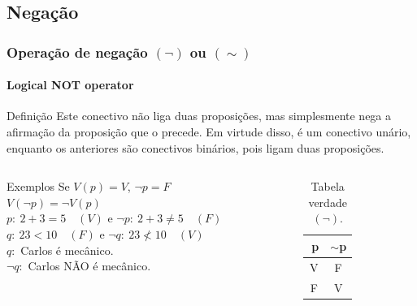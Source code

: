 \documentclass[10pt, headsepline, captions=tableabove,xcolor=table]{beamer}
\begin{document}
\subsection{Negação}
%
\begin{frame}[t]
    \frametitle{Operação de negação $(\lnot)$ ou $(\sim)$}
    \framesubtitle{Logical NOT operator}
    \begin{block}{Definição}
        Este conectivo não liga duas proposições, mas simplesmente nega a afirmação da proposição que o precede. Em virtude disso, é um conectivo unário, enquanto os anteriores são conectivos binários, pois ligam duas proposições.
    \end{block}
    \vspace{-4mm}
    \begin{columns}[t]
        \begin{column}{0.6\textwidth}
            \begin{exampleblock}{Exemplos}
                Se $V(p) = V$, $\lnot p = F$ \\ [2pt]
                $V(\lnot p) = \lnot V(p)$ \\ [2pt]
                $p:~2+3=5\quad (V)$ e $\lnot p:~2+3 \neq 5\quad (F)$ \\ [2pt]
                $q:~23 < 10 \quad (F)$ e $\lnot q:~23 \nless 10 \quad (V)$ \\[2pt]
                $q:$ Carlos é mecânico. \\[2pt]
                $\lnot q:$ Carlos NÃO é mecânico.
            \end{exampleblock}
        \end{column}
        \hspace{-3mm}
        \begin{column}{0.4\textwidth}
            \begin{table}[t]
                \caption{Tabela verdade $(\lnot)$.}
                \label{tab:tabela-not}
                \begin{tabular}{|c|c|}
                \hline
                \rowcolor[HTML]{EFEFEF} 
                \textbf{$~$p} & \textbf{$\sim$p} \\ \hline
                V          & F                \\ \hline
                F          & V                \\ \hline
                \end{tabular}
            \end{table}
        \end{column}
    \end{columns}
\end{frame}
%
\end{document}
